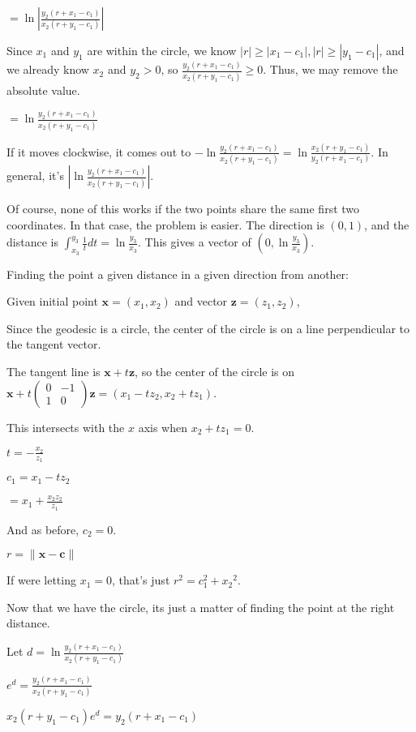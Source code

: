 \documentclass[12pt]{amsart}
\newcommand{\mat}[4]{\left(\begin{array}{ccc} #1 & #2 \\#3 & #4 \end{array} \right)}
\begin{document}
$= \ln\left|\frac{y_2(r+x_1-c_1)}{x_2(r+y_1-c_1)}\right|$

Since $x_1$ and $y_1$ are within the circle, we know $|r| \geq |x_1-c_1|, |r| \geq |y_1-c_1|$, and we already know $x_2$ and $y_2 > 0$, so $\frac{y_2(r+x_1-c_1)}{x_2(r+y_1-c_1)} \geq 0$. Thus, we may remove the absolute value.

$= \ln\frac{y_2(r+x_1-c_1)}{x_2(r+y_1-c_1)}$

If it moves clockwise, it comes out to $-\ln\frac{y_2(r+x_1-c_1)}{x_2(r+y_1-c_1)} = \ln\frac{x_2(r+y_1-c_1)}{y_2(r+x_1-c_1)}$. In general, it's $\left|\ln\frac{y_2(r+x_1-c_1)}{x_2(r+y_1-c_1)}\right|$.

Of course, none of this works if the two points share the same first two coordinates. In that case, the problem is easier. The direction is $(0,1)$, and the distance is $\int_{x_3}^{y_3} \frac{1}{t} dt = \ln\frac{y_3}{x_3}$. This gives a vector of $(0,\ln\frac{y_3}{x_3})$.

\bigskip

Finding the point a given distance in a given direction from another:

\bigskip

Given initial point $\textbf{x} = (x_1,x_2)$ and vector $\textbf{z} = (z_1,z_2)$,

Since the geodesic is a circle, the center of the circle is on a line perpendicular to the tangent vector.

The tangent line is $\textbf{x}+t\textbf{z}$, so the center of the circle is on $\textbf{x}+t\mat{0}{-1}{1}{0}\textbf{z} = (x_1-tz_2,x_2+tz_1)$.

This intersects with the $x$ axis when $x_2+tz_1 = 0$.

$t = -\frac{x_2}{z_1}$

$c_1 = x_1-tz_2$

$= x_1+\frac{x_2z_2}{z_1}$


And as before, $c_2 = 0$.

$r = \|\textbf{x}-\textbf{c}\|$

If were letting $x_1 = 0$, that's just $r^2 = c_1^2+{x_2}^2$.

Now that we have the circle, its just a matter of finding the point at the right distance.

Let $d = \ln\frac{y_2(r+x_1-c_1)}{x_2(r+y_1-c_1)}$

$e^d = \frac{y_2(r+x_1-c_1)}{x_2(r+y_1-c_1)}$

$x_2(r+y_1-c_1)e^d = y_2(r+x_1-c_1)$
\end{document}
